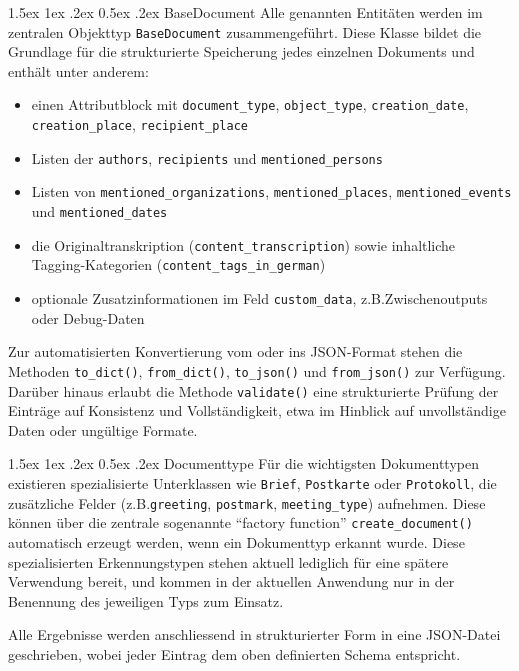 \documentclass[12pt, a4paper, ngerman, bidi=default]{article}
\makeatletter
\newcommand{\code}[1]{\colorbox{VeryLightGray}{\texttt{#1}}} %
\let\oldparagraph\paragraph%
\renewcommand{\paragraph}{
    \@ifstar%
      \xxxParagraphStar%
      \xxxParagraphNoStar%
 }
\newcommand{\xxxParagraphStar}[1]{\oldparagraph*{#1}\mbox{}}
\newcommand{\xxxParagraphNoStar}[1]{\oldparagraph{#1}\mbox{}}
\renewcommand\paragraph{\@startsection{paragraph}{4}{0em}%
  {1.5ex \@plus1ex \@minus.2ex}%
  {0.5ex \@plus.2ex}%
  {\normalfont\normalsize\bfseries\itshape}}
\makeatother
\begin{document}
\paragraph{BaseDocument}
Alle genannten Entitäten werden im zentralen Objekttyp \code{BaseDocument} zusammengeführt. Diese Klasse bildet 
die Grundlage für die strukturierte Speicherung jedes einzelnen Dokuments und enthält unter anderem:
\begin{itemize}
\item einen Attributblock mit \code{document\_type}, \code{object\_type}, \code{creation\_date}, \code{creation\_place}, \code{recipient\_place}
\item Listen der \code{authors}, \code{recipients} und \code{mentioned\_persons}
\item Listen von \code{mentioned\_organizations}, \code{mentioned\_places}, \code{mentioned\_events} und \code{mentioned\_dates}
\item die Originaltranskription (\code{content\_transcription}) sowie inhaltliche Tagging-Kategorien (\code{content\_tags\_in\_german})
\item optionale Zusatzinformationen im Feld \code{custom\_data}, z.B.Zwischenoutputs oder Debug-Daten
\end{itemize}

Zur automatisierten Konvertierung vom oder ins JSON-Format stehen die Methoden \code{to\_dict()}, \code{from\_dict()}, \code{to\_json()} und \code{from\_json()} zur Verfügung. Darüber hinaus erlaubt die Methode \code{validate()} eine strukturierte Prüfung der Einträge auf Konsistenz und Vollständigkeit, etwa im Hinblick auf unvollständige Daten oder ungültige Formate.

\paragraph{Documenttype}
Für die wichtigsten Dokumenttypen existieren spezialisierte Unterklassen wie \code{Brief}, 
\code{Postkarte} oder \code{Protokoll}, die zusätzliche Felder (z.B.\code{greeting}, \code{postmark}, \code{meeting\_type}) aufnehmen. 
Diese können über die zentrale sogenannte \enquote{factory function} \code{create\_document()} automatisch erzeugt werden, wenn ein Dokumenttyp erkannt wurde. 
Diese spezialisierten Erkennungstypen stehen aktuell lediglich für eine spätere Verwendung bereit, und kommen in der aktuellen Anwendung nur in der Benennung des jeweiligen Typs zum Einsatz.

Alle Ergebnisse werden anschliessend in strukturierter Form in eine JSON-Datei geschrieben, wobei jeder Eintrag dem oben definierten Schema 
entspricht. 
\end{document}
